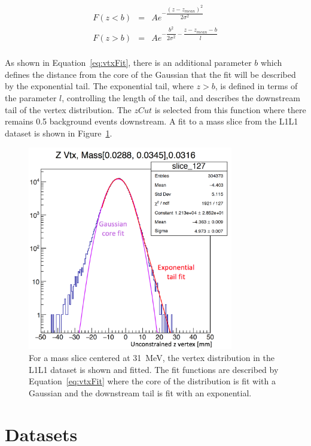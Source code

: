\documentclass[twoside]{article}
\begin{document}
\begin{eqnarray*}
\label{eq:vtxFit}
F(z < b) & = & Ae^{-\dfrac{(z-z_{mean})^2}{2\sigma^2}}\\
F(z > b) & = & Ae^{-\dfrac{b^2}{2\sigma^2}-\dfrac{z-z_{mean}-b}{l}}\\
\end{eqnarray*}

As shown in Equation~\eqref{eq:vtxFit}, there is an additional parameter $b$ which defines the distance from the core of the Gaussian that the fit will be described by the exponential tail. The exponential tail, where $z>b$, is defined in terms of the parameter $l$, controlling the length of the tail, and describes the downstream tail of the vertex distribution. The $zCut$ is selected from this function where there remains 0.5 background events downstream. A fit to a mass slice from the L1L1 dataset is shown in Figure~\ref{fig:vtxFitPic}.

\begin{figure}[H]
  \centering
      \includegraphics[width=0.8\textwidth]{plots/vtxFit.png}
  \caption{For a mass slice centered at 31~MeV, the vertex distribution in the L1L1 dataset is shown and fitted. The fit functions are described by Equation~\eqref{eq:vtxFit} where the core of the distribution is fit with a Gaussian and the downstream tail is fit with an exponential.}
  \label{fig:vtxFitPic}
\end{figure} 


\section{Datasets}
\end{document}
